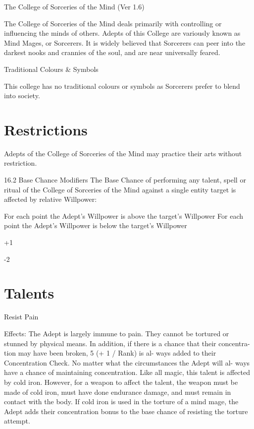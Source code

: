\begin{Chapter}{The College of Sorceries of the Mind (Ver 1.6)}

The College of Sorceries of the Mind deals primarily with controlling
or influencing the minds of others. Adepts of this College are
variously known as Mind Mages, or Sorcerers. It is widely believed
that Sorcerers can peer into the darkest nooks and crannies of the
soul, and are near universally feared.

Traditional Colours \& Symbols  

This  college  has  no  traditional  colours  or  symbols 
as Sorcerers prefer to blend into society. 

\section{Restrictions}

Adepts of the College of Sorceries of the Mind may practice their arts
without restriction.


16.2 Base Chance Modifiers 
The Base Chance of performing any talent, spell or 
ritual  of  the  College  of  Sorceries  of  the  Mind 
against a single entity target is affected by relative 
Willpower: 

For each point the Adept’s Willpower is 
above the target’s Willpower 
For each point the Adept’s Willpower is 
below the target’s Willpower 

+1 

-2 


\section{Talents }

\begin{talent}[T-1]{Resist Pain }

Effects: The Adept is largely immune to pain. They 
cannot  be  tortured  or  stunned  by  physical  means. 
In addition, if there is a chance that their concentra-
tion  may  have  been  broken,  5  (+  1  /  Rank)  is  al-
ways  added  to  their  Concentration  Check.  No 
matter  what  the  circumstances  the  Adept  will  al-
ways  have  a  chance  of  maintaining  concentration. 
Like all magic, this talent is affected by cold iron. 
However,  for  a  weapon  to  affect  the  talent,  the 
weapon must be made of cold iron, must have done 
endurance  damage,  and  must  remain  in  contact 
with the body. If cold iron is used in the torture of 
a  mind  mage,  the  Adept  adds  their  concentration 
bonus  to  the  base  chance  of  resisting  the  torture 
attempt. 


\end{talent}
\end{Chapter}

